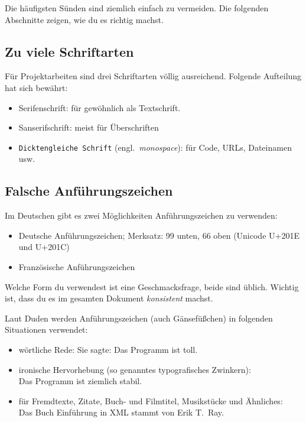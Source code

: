 \documentclass[a4paper,titlepage=true,twoside]{scrartcl}
\newcommand{\gquote}[1]{\glqq #1\grqq}
\newcommand{\fquote}[1]{\frqq #1\flqq}
\begin{document}

Die häufigsten Sünden sind ziemlich einfach zu vermeiden. Die folgenden
Abschnitte zeigen, wie du es richtig machst.

\subsection{Zu viele Schriftarten}
Für Projektarbeiten sind drei Schriftarten völlig ausreichend. Folgende
Aufteilung hat sich bewährt:

\begin{itemize}
 \item Serifenschrift: für gewöhnlich als Textschrift.
 \item \textsf{Sanserifschrift}: meist für Überschriften
 \item \verb!Dicktengleiche Schrift! (engl.~\emph{monospace}): für Code, URLs, Dateinamen usw.
\end{itemize}


\subsection{Falsche Anführungszeichen}
Im Deutschen gibt es zwei Möglichkeiten Anführungszeichen zu verwenden:

\begin{itemize}
 \item \gquote{Deutsche Anführungszeichen}; Merksatz: 99 unten, 66 oben (Unicode U+201E und U+201C)
 \item \fquote{Französische Anführungszeichen}
\end{itemize}

Welche Form du verwendest ist eine Geschmacksfrage, beide sind üblich. Wichtig ist,
dass du es im gesamten Dokument \emph{konsistent} machst.

Laut Duden werden Anführungszeichen (auch \gquote{Gänsefüßchen}) in
folgenden Situationen verwendet:

\begin{itemize}
 \item wörtliche Rede: Sie sagte: \gquote{Das Programm ist toll.}
 \item ironische Hervorhebung (so genanntes \gquote{typografisches Zwinkern}):\\
 Das Programm ist \gquote{ziemlich} stabil.
 \item für Fremdtexte, Zitate, Buch- und Filmtitel, Musikstücke und Ähnliches:\\
 Das Buch \gquote{Einführung in XML} stammt von Erik T.\ Ray.
\end{itemize}
\end{document}
